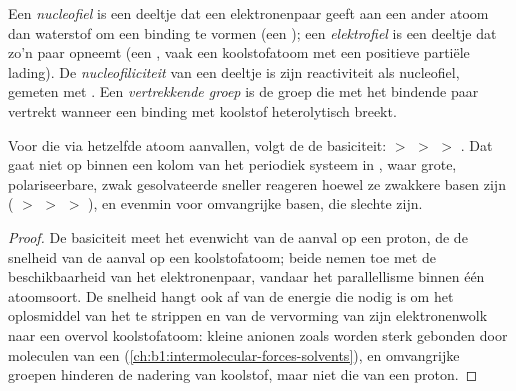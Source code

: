 \begin{definition}\label{def:b1:electronic-effects:nucleophile}
Een \emph{nucleofiel} is een deeltje dat een
elektronenpaar geeft aan een ander atoom dan waterstof om een binding te
vormen (een ); een \emph{elektrofiel} is een
deeltje dat zo'n paar opneemt (een , vaak een koolstofatoom met
een positieve partiële lading). De
\emph{nucleofiliciteit} van een deeltje is zijn
reactiviteit als nucleofiel, gemeten met . Een
\emph{vertrekkende groep} is de groep die met
het bindende paar vertrekt wanneer een binding met koolstof heterolytisch
breekt.
\end{definition}

\begin{proposition}\label{prop:b1:electronic-effects:nucleophilicity-basicity}
Voor  die via hetzelfde atoom aanvallen, volgt de
 de basiciteit:  $>$  $>$ 
$>$ . Dat gaat niet op binnen een kolom van het periodiek systeem
in , waar grote, polariseerbare, zwak
gesolvateerde  sneller reageren hoewel ze zwakkere basen zijn
( $>$  $>$  $>$ ), en evenmin voor
omvangrijke basen, die slechte  zijn.
\end{proposition}

\begin{proof}
De basiciteit meet het evenwicht van de aanval op een proton, de
 de snelheid van de aanval op een koolstofatoom; beide
nemen toe met de beschikbaarheid van het elektronenpaar, vandaar het
parallellisme binnen één atoomsoort. De snelheid hangt ook af van de
energie die nodig is om het oplosmiddel van het  te strippen en
van de vervorming van zijn elektronenwolk naar een overvol
koolstofatoom: kleine anionen zoals  worden sterk gebonden door
moleculen van een 
(\cref{ch:b1:intermolecular-forces-solvents}), en omvangrijke groepen
hinderen de nadering van koolstof, maar niet die van een proton.
\end{proof}


